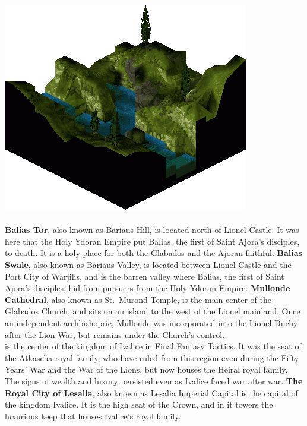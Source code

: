 \includegraphics[width=\columnwidth]{./art/images/bariaus.png}
\\\\
%
\textbf{Balias Tor}, also known as Bariaus Hill, is located north of Lionel Castle. 
It was here that the Holy Ydoran Empire put Balias, the first of Saint Ajora’s disciples, to death. 
It is a holy place for both the Glabados and the Ajoran faithful.
\textbf{Balias Swale}, also known as Bariaus Valley, is located between Lionel Castle and the Port City of Warjilis, and is the barren valley where Balias, the first of Saint Ajora's disciples, hid from pursuers from the Holy Ydoran Empire.
\textbf{Mullonde Cathedral}, also known as St.~Murond Temple, is the main center of the Glabados Church, and sits on an island to the west of the Lionel mainland. 
Once an independent archbishopric, Mullonde was incorporated into the Lionel Duchy after the Lion War, but remains under the Church's control.
%
%
\pagebreak\\
%
 is the center of the kingdom of Ivalice in Final Fantasy Tactics. 
It was the seat of the Atkascha royal family, who have ruled from this region even during the Fifty Years' War and the War of the Lions, but now houses the Heiral royal family. 
The signs of wealth and luxury persisted even as Ivalice faced war after war.
\textbf{The Royal City of Lesalia}, also known as Lesalia Imperial Capital is the capital of the kingdom Ivalice. 
It is the high seat of the Crown, and in it towers the luxurious keep that houses Ivalice's royal family. 
